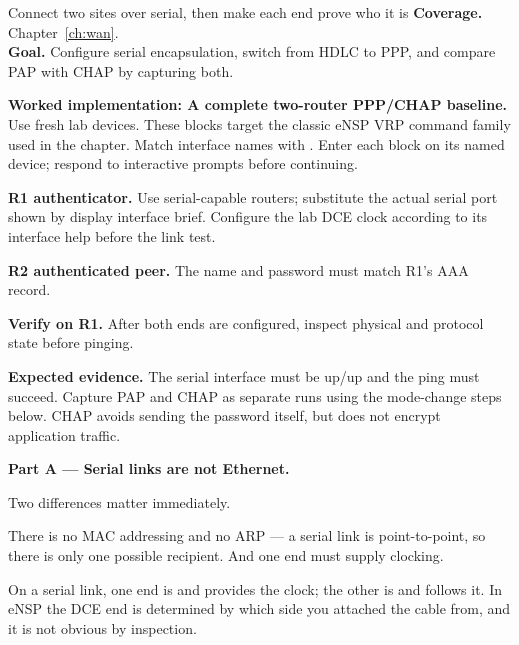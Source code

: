 
\begin{labproject}{Connect two sites over serial, then make each end prove who it is}
\textbf{Coverage.} Chapter~\ref{ch:wan}.\\
\textbf{Goal.} Configure serial encapsulation, switch from HDLC to PPP, and compare PAP with CHAP by capturing both.



\noindent\textbf{Worked implementation: A complete two-router PPP/CHAP baseline.}
Use fresh lab devices. These blocks target the classic eNSP VRP command family used in the chapter. Match interface names with . Enter each block on its named device; respond to interactive prompts before continuing.

\noindent\textbf{R1 authenticator.} Use serial-capable routers; substitute the actual serial port shown by display interface brief. Configure the lab DCE clock according to its interface help before the link test.


\noindent\textbf{R2 authenticated peer.} The name and password must match R1's AAA record.


\noindent\textbf{Verify on R1.} After both ends are configured, inspect physical and protocol state before pinging.


\textbf{Expected evidence.} The serial interface must be up/up and the ping must succeed. Capture PAP and CHAP as separate runs using the mode-change steps below. CHAP avoids sending the password itself, but does not encrypt application traffic.




\medskip\noindent\textbf{Part A --- Serial links are not Ethernet.}\par
Two differences matter immediately.

There is no MAC addressing and no ARP --- a serial link is point-to-point, so there is only one possible recipient. And one end must supply clocking.

\begin{keyidea}
On a serial link, one end is  and provides the clock; the other is  and follows it. In eNSP the DCE end is determined by which side you attached the cable from, and it is not obvious by inspection.


\end{keyidea}
\end{labproject}
